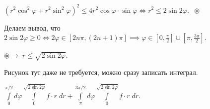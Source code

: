 \documentclass[a4paper, fleqn]{article}
\begin{document}
    $(r^2\cos^2\varphi + r^2\sin^2\varphi)^2 \leq 4 r^2 \cos \varphi \cdot \sin \varphi \iff r^2 \leq 2\sin 2\varphi. \; \; \circledast$
    
    Делаем вывод, что $2 \sin 2 \varphi \geq 0 \iff 2 \varphi \in [2n \pi, (2n + 1)\pi] \implies \varphi \in \left[0, \frac{\pi}{2}\right] \cup \left[\pi, \frac{3\pi}{2} \right].$
    
    $\circledast \to \; r \leq \sqrt{2 \sin 2 \varphi}.$ 
    
    Рисунок тут даже не требуется, можно сразу записать интеграл.
    
    $\displaystyle\int\limits_{0}^{\pi/2} d \varphi \int\limits_{0}^{\sqrt{2 \sin 2 \varphi}} f \cdot r \; d r + \int\limits_{\pi}^{3\pi/2} d \varphi \int\limits_{0}^{\sqrt{2 \sin 2 \varphi}} f \cdot r \; d r. $
    
\end{document}
